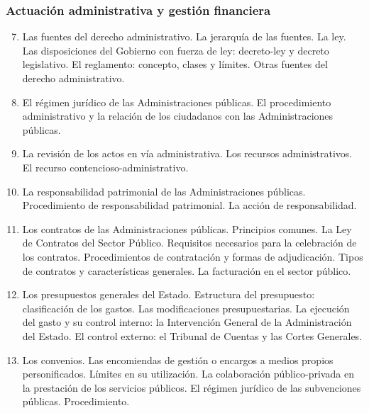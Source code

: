 	\subsubsection{Actuación administrativa y gestión financiera}
	\begin{enumerate}
		\setcounter{enumi}{6}
		\item Las fuentes del derecho administrativo. La jerarquía de las fuentes. La ley. Las disposiciones del Gobierno con fuerza de ley: decreto-ley y decreto legislativo. El reglamento: concepto, clases y límites. Otras fuentes del derecho administrativo.
		\item El régimen jurídico de las Administraciones públicas. El procedimiento administrativo y la relación de los ciudadanos con las Administraciones públicas.
		\item  La revisión de los actos en vía administrativa. Los recursos administrativos. El recurso contencioso-administrativo.
		\item La responsabilidad patrimonial de las Administraciones públicas. Procedimiento de responsabilidad patrimonial. La acción de responsabilidad.
		\item Los contratos de las Administraciones públicas. Principios comunes. La Ley de Contratos del Sector Público. Requisitos necesarios para la celebración de los contratos. Procedimientos de contratación y formas de adjudicación. Tipos de contratos y características generales. La facturación en el sector público.
		\item Los presupuestos generales del Estado. Estructura del presupuesto: clasificación de los gastos. Las modificaciones presupuestarias. La ejecución del gasto y su control interno: la Intervención General de la Administración del Estado. El control externo: el Tribunal de Cuentas y las Cortes Generales.
		\item Los convenios. Las encomiendas de gestión o encargos a medios propios personificados. Límites en su utilización. La colaboración público-privada en la prestación de los servicios públicos. El régimen jurídico de las subvenciones públicas. Procedimiento. 
	\end{enumerate}
